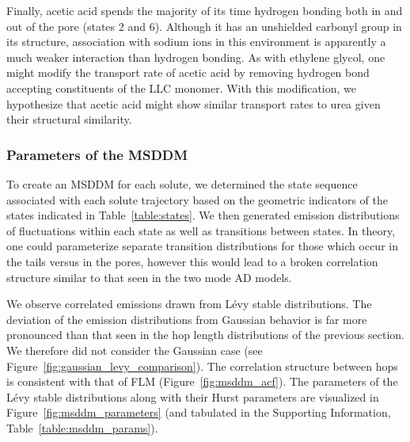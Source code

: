 \documentclass[journal=ancac3,manuscript=article,layout=twocolumn]{achemso}
\begin{document}
  Finally, acetic acid spends the majority of its time hydrogen bonding both in
  and out of the pore (states 2 and 6). Although it has an unshielded carbonyl
  group in its structure, association with sodium ions in this environment is
  apparently a much weaker interaction than hydrogen bonding.  As with ethylene
  glycol, one might modify the transport rate of acetic acid by removing
  hydrogen bond accepting constituents of the LLC monomer. With this
  modification, we hypothesize that acetic acid might show similar transport
  rates to urea given their structural similarity.
  
  \subsubsection{Parameters of the MSDDM}\label{section:msddm_parameterization}

  To create an MSDDM for each solute, we determined the state sequence associated
  with each solute trajectory based on the geometric indicators of the states 
  indicated in Table~\ref{table:states}. We then generated emission distributions of fluctuations
  within each state as well as transitions between states. In theory, one could 
  parameterize separate transition distributions for those which occur in the tails 
  versus in the pores, however this would lead to a broken correlation structure 
  similar to that seen in the two mode AD models.

  We observe correlated emissions drawn from L\'evy stable distributions. The
  deviation of the emission distributions from Gaussian behavior is far more
  pronounced than that seen in the hop length distributions of the previous
  section. We therefore did not consider the Gaussian case (see
  Figure~\ref{fig:gaussian_levy_comparison}). The correlation structure
  between hops is consistent with that of FLM (Figure~\ref{fig:msddm_acf}).
  The parameters of the L\'evy stable distributions along with their Hurst
  parameters are visualized in Figure~\ref{fig:msddm_parameters} (and tabulated
  in the Supporting Information, Table~\ref{table:msddm_params}). 
  
\end{document}
